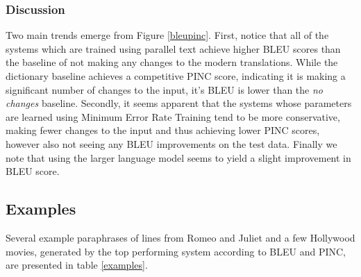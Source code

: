 \documentclass[10pt,a5paper,twoside]{article}
\begin{document}
\subsubsection{Discussion}
Two main trends emerge from Figure \ref{bleupinc}.  First, notice that all of the systems which are trained using parallel text achieve higher BLEU scores than the baseline
of not making any changes to the modern translations.  While the dictionary baseline achieves a competitive PINC score, indicating it is making a significant number of changes to the 
input, it's BLEU is lower than the \emph{no changes} baseline.  Secondly, it seems apparent that the systems whose parameters are learned using Minimum Error Rate Training \cite{MERT}
tend to be more conservative, making fewer changes to the input and thus achieving lower PINC scores, however also not seeing any BLEU improvements on the test data.  Finally
we note that using the larger language model seems to yield a slight improvement in BLEU score.

\subsection{Examples}
Several example paraphrases of lines from Romeo and Juliet and a few Hollywood movies, generated by the top performing system according to BLEU and PINC, are presented in table \ref{examples}.
\end{document}
